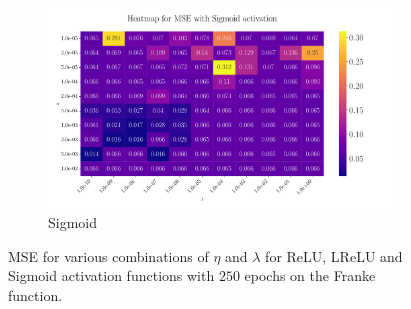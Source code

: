 \documentclass[%
reprint,s
amsmath,amssymb,
aps,
]{revtex4-2}
\begin{document}
\begin{figure}[ht!]
\begin{subfigure}{0.41\textwidth}
		\includegraphics[width=\textwidth]{Figures/Heatmap_MSE_Sigmoid_Franke_Epochs250.pdf}
		\caption{Sigmoid}
	\end{subfigure}
	\caption{MSE for various combinations of $\eta$ and $\lambda$ for ReLU, LReLU and Sigmoid activation functions with $250$ epochs on the Franke function.}
	\label{fig:FFNN_Franke_heatmaps}	
\end{figure}
\end{document}
